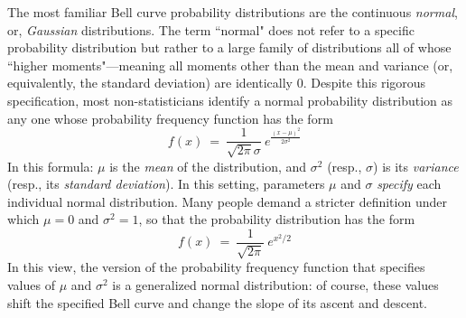 The most familiar Bell curve probability distributions are the continuous {\em normal}, or, {\it Gaussian} distributions.  The term ``normal" does not refer to a specific probability distribution but rather to a large family of distributions all of whose ``higher moments"---meaning all moments other than the mean and variance (or, equivalently, the standard deviation) are identically $0$.  Despite this rigorous specification, most non-statisticians identify a normal probability distribution as any one whose probability frequency function has the form
\[ f(x) \ = \ \frac{1}{\sqrt{2 \pi} \sigma} \ e^{\frac{(x - \mu)^2}{2 \sigma^2} } \]
In this formula: $\mu$ is the {\it mean} of the distribution, and $\sigma^2$ (resp., $\sigma$) is its {\it variance} (resp., its {\it standard deviation}).  In this setting, parameters $\mu$ and $\sigma$ {\em specify} each individual normal distribution.  Many people demand a stricter definition under which $\mu = 0$ and $\sigma^2 = 1$, so that the probability distribution has the form
\[ f(x) \ = \ \frac{1}{\sqrt{2 \pi}} \ e^{x^2/2} \]
In this view, the version of the probability frequency function that specifies values of $\mu$ and $\sigma^2$ is a generalized normal distribution: of course, these values shift the specified Bell curve and change the slope of its ascent and descent.

\bigskip

\noindent {}

\bigskip

 

